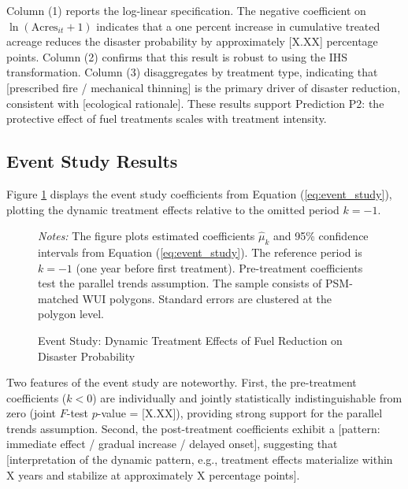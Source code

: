 \documentclass[12pt, letterpaper]{article}
\begin{document}
Column (1) reports the log-linear specification. The negative coefficient on $\ln(\text{Acres}_{it}+1)$ indicates that a one percent increase in cumulative treated acreage reduces the disaster probability by approximately [X.XX] percentage points. Column (2) confirms that this result is robust to using the IHS transformation. Column (3) disaggregates by treatment type, indicating that [prescribed fire / mechanical thinning] is the primary driver of disaster reduction, consistent with [ecological rationale]. These results support Prediction P2: the protective effect of fuel treatments scales with treatment intensity.

\subsection{Event Study Results}

Figure \ref{fig:event_study} displays the event study coefficients from Equation (\ref{eq:event_study}), plotting the dynamic treatment effects relative to the omitted period $k = -1$.

\begin{figure}[H]
\centering
{}
\caption{Event Study: Dynamic Treatment Effects of Fuel Reduction on Disaster Probability}
\label{fig:event_study}
\begin{minipage}{0.9\textwidth}
\small
\textit{Notes:} The figure plots estimated coefficients $\hat{\mu}_k$ and 95\% confidence intervals from Equation (\ref{eq:event_study}). The reference period is $k = -1$ (one year before first treatment). Pre-treatment coefficients test the parallel trends assumption. The sample consists of PSM-matched WUI polygons. Standard errors are clustered at the polygon level.
\end{minipage}
\end{figure}

Two features of the event study are noteworthy. First, the pre-treatment coefficients ($k < 0$) are individually and jointly statistically indistinguishable from zero (joint $F$-test $p$-value = [X.XX]), providing strong support for the parallel trends assumption. Second, the post-treatment coefficients exhibit a [pattern: immediate effect / gradual increase / delayed onset], suggesting that [interpretation of the dynamic pattern, e.g., treatment effects materialize within X years and stabilize at approximately X percentage points].
\end{document}
